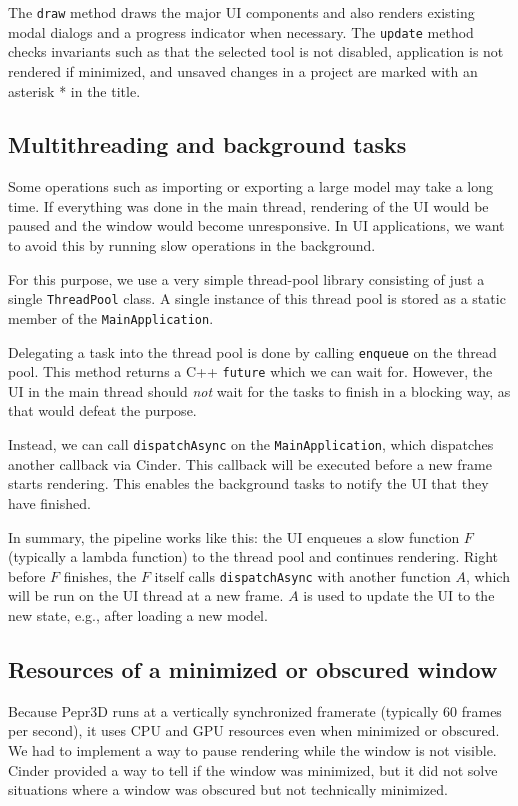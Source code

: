 The \texttt{draw} method draws the major UI components and also renders existing modal dialogs and a progress indicator when necessary.
The \texttt{update} method checks invariants such as that the selected tool is not disabled, application is not rendered if minimized, and unsaved changes in a project are marked with an asterisk * in the title.

\subsection{Multithreading and background tasks}

Some operations such as importing or exporting a large model may take a long time.
If everything was done in the main thread, rendering of the UI would be paused and the window would become unresponsive.
In UI applications, we want to avoid this by running slow operations in the background.

For this purpose, we use a very simple thread-pool library consisting of just a single \texttt{ThreadPool} class.
A single instance of this thread pool is stored as a static member of the \texttt{MainApplication}.

Delegating a task into the thread pool is done by calling \texttt{enqueue} on the thread pool.
This method returns a C++ \texttt{future} which we can wait for.
However, the UI in the main thread should \emph{not} wait for the tasks to finish in a blocking way, as that would defeat the purpose.

Instead, we can call \texttt{dispatchAsync} on the \texttt{MainApplication}, which dispatches another callback via Cinder.
This callback will be executed before a new frame starts rendering.
This enables the background tasks to notify the UI that they have finished.

In summary, the pipeline works like this: the UI enqueues a slow function $F$ (typically a lambda function) to the thread pool and continues rendering.
Right before $F$ finishes, the $F$ itself calls \texttt{dispatchAsync} with another function $A$, which will be run on the UI thread at a new frame.
$A$ is used to update the UI to the new state, e.g., after loading a new model.

\subsection{Resources of a minimized or obscured window}

Because Pepr3D runs at a vertically synchronized framerate (typically 60 frames per second), it uses CPU and GPU resources even when minimized or obscured.
We had to implement a way to pause rendering while the window is not visible.
Cinder provided a way to tell if the window was minimized, but it did not solve situations where a window was obscured but not technically minimized.

